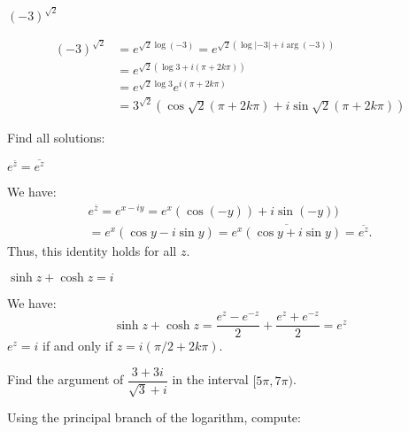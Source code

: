 \documentclass[answers, 12pt]{exam}
\DeclareMathOperator{\Log}{Log}
\DeclareMathOperator{\Arg}{Arg}
\begin{document}
\begin{questions}
\begin{parts}
    \item $(-3)^{\sqrt2}$
    \begin{solution}
        \begin{align*}
            (-3)^{\sqrt 2} &= e^{\sqrt2\log(-3)} = e^{\sqrt2(\log|-3| + i\arg(-3))}\\
            &=e^{\sqrt2(\log3 + i(\pi + 2k\pi))}\\
            &= e^{\sqrt2\log 3}e^{i(\pi + 2k\pi)}\\
            &= 3^{\sqrt2}\left(\cos\sqrt2(\pi + 2k\pi) + i\sin\sqrt2(\pi + 2k\pi)\right)
        \end{align*}
    \end{solution}
\end{parts}

\question
Find all solutions:
\begin{parts}
    \item $e^{\bar{z}}=\overline{e^z}$
    \begin{solution}
        We have:
        \begin{multline*}
            e^{\bar z} = e^{x-iy} = e^x(\cos(-y)) + i\sin(-y))\\ = e^x(\cos y - i\sin y) = 
            \overline{e^x(\cos y + i\sin y)} = \overline{e^z}.
        \end{multline*}
        Thus, this identity holds for all $z$.
    \end{solution}

    \item $\sinh z + \cosh z = i$
    \begin{solution}
        We have:
    \[          
        \sinh z + \cosh z = \frac{e^z - e^{-z}}{2} + \frac{e^z + e^{-z}}{2} = e^z
    \]
    $e^z = i$ if and only if $z=i(\pi/2+2k\pi)$.
    \end{solution}
\end{parts}
 

    

\question
Find the argument of $\dfrac{3+3i}{\sqrt3 + i}$ in the interval $[5\pi, 7\pi)$.

\question
Using the principal branch of the logarithm, compute:
\end{questions}
\end{document}
